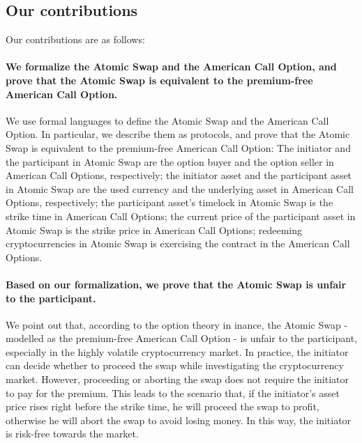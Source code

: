 \subsection{Our contributions}

Our contributions are as follows:

\paragraph{We formalize the Atomic Swap and the American Call Option, and prove that the Atomic Swap is equivalent to the premium-free American Call Option.}
We use formal languages to define the Atomic Swap and the American Call Option.
In particular, we describe them as protocols, and prove that the Atomic Swap is equivalent to the premium-free American Call Option:
The initiator and the participant in Atomic Swap are the option buyer and the option seller in American Call Options, respectively;
the initiator asset and the participant asset in Atomic Swap are the used currency and the underlying asset in American Call Options, respectively;
the participant asset's timelock in Atomic Swap is the strike time in American Call Options;
the current price of the participant asset in Atomic Swap is the strike price in American Call Options;
redeeming cryptocurrencies in Atomic Swap is exercising the contract in the American Call Options.

\paragraph{Based on our formalization, we prove that the Atomic Swap is unfair to the participant.}
We point out that, according to the option theory in inance, the Atomic Swap - modelled as the premium-free American Call Option - is unfair to the participant, especially in the highly volatile cryptocurrency market.
In practice, the initiator can decide whether to proceed the swap while investigating the cryptocurrency market.
However, proceeding or aborting the swap does not require the initiator to pay for the premium.
This leads to the scenario that, if the initiator's asset price rises right before the strike time, he will proceed the swap to profit, otherwise he will abort the swap to avoid losing money.
In this way, the initiator is risk-free towards the market.

